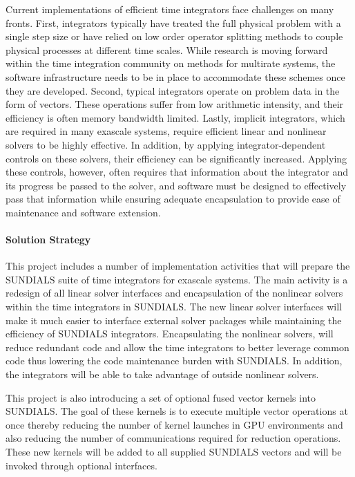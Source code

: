 Current implementations of efficient time integrators face challenges on many fronts.  First, integrators typically have treated the full physical problem with a single step size or have relied on low order operator splitting methods to couple physical processes at different time scales. While research is moving forward within the time integration community on methods for multirate systems, the software infrastructure needs to be in place to accommodate these schemes once they are developed.   Second, typical integrators operate on problem data in the form of vectors.  These operations suffer from low arithmetic intensity, and their efficiency is often memory bandwidth limited.  Lastly, implicit integrators, which are required in many exascale systems, require efficient linear and nonlinear solvers to be highly effective.  In addition, by applying integrator-dependent controls on these solvers, their efficiency can be significantly increased.  Applying these controls, however, often requires that information about the integrator and its progress be passed to the solver, and software must be designed to effectively pass that information while ensuring adequate encapsulation to provide ease of maintenance and software extension.

\paragraph{Solution Strategy}

This project includes a number of implementation activities that will prepare the SUNDIALS suite of time integrators for exascale systems. The main activity is a redesign of all linear solver interfaces and encapsulation of the nonlinear solvers within the time integrators in SUNDIALS.  The new linear solver interfaces will make it much easier to interface external solver packages while maintaining the efficiency of SUNDIALS integrators. Encapsulating the nonlinear solvers, will reduce redundant code and allow the time integrators to better leverage common code thus lowering the code maintenance burden with SUNDIALS.  In addition, the integrators will be able to take advantage of outside nonlinear solvers.  

This project is also introducing a set of optional fused vector kernels into SUNDIALS.  The goal of these kernels is to execute multiple vector operations at once thereby reducing the number of kernel launches in GPU environments and also reducing the number of communications required for reduction operations.  These new kernels will be added to all supplied SUNDIALS vectors and will be invoked through optional interfaces.


